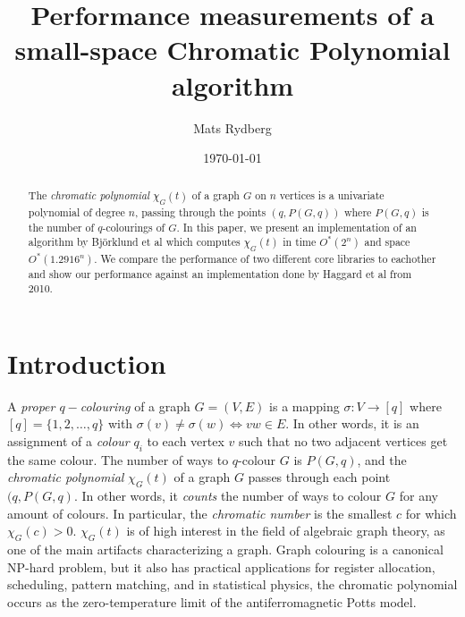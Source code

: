 \documentclass[a4paper]{article}
\title{\huge{Performance measurements of a small-space Chromatic Polynomial algorithm}}
\author{Mats Rydberg}
\date{\today}
\begin{document}
\maketitle

\begin{abstract}
 The \emph{chromatic polynomial} $\chi_G(t)$ of a graph $G$ on $n$ vertices is a univariate polynomial of degree $n$, passing through the points $(q, P(G,q))$ where $P(G,q)$ is the number of $q$-colourings of $G$. In this paper, we present an implementation of an algorithm by Björklund et al which computes $\chi_G(t)$ in time $O^*(2^n)$ and space $O^*(1.2916^n)$. We compare the performance of two different core libraries to eachother and show our performance against an implementation done by Haggard et al from 2010. 
\end{abstract}

\newpage

\section{Introduction}

A \emph{proper $q-$colouring} of a graph $G = (V, E)$ is a mapping $\sigma: V \rightarrow [q]$ where $[q] = \{1,2,\ldots,q\}$ with $\sigma(v) \neq \sigma(w) \Leftrightarrow vw \in E$. In other words, it is an assignment of a \emph{colour} $q_i$ to each vertex $v$ such that no two adjacent vertices get the same colour.
The number of ways to $q$-colour $G$ is $P(G,q)$, and the \emph{chromatic polynomial} $\chi_G(t)$ of a graph $G$ passes through each point $(q, P(G,q)$. In other words, it \emph{counts} the number of ways to colour $G$ for any amount of colours.
In particular, the \emph{chromatic number} is the smallest $c$ for which $\chi_G(c) > 0$. $\chi_G(t)$ is of high interest in the field of algebraic graph theory, as one of the main artifacts characterizing a graph. Graph colouring is a canonical NP-hard problem, but it also has practical applications for register allocation, scheduling, pattern matching, and in statistical physics, the chromatic polynomial occurs as the zero-temperature limit of the antiferromagnetic Potts model. \cite{chaitin} \cite{marx} 
\end{document}
